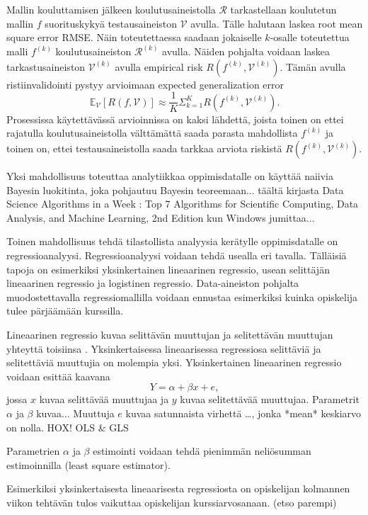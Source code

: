 Mallin kouluttamisen jälkeen koulutusaineistolla $\mathcal{R}$ tarkastellaan koulutetun mallin $f$ suorituskykyä testausaineiston $\mathcal{V}$ avulla. Tälle halutaan laskea root mean square error RMSE. Näin toteutettaessa saadaan jokaiselle $k$-osalle toteutettua malli $f^{(k)}$ koulutusaineiston $\mathcal{R}^{(k)}$ avulla. Näiden pohjalta voidaan laskea tarkastusaineiston $\mathcal{V}^{(k)}$ avulla empirical risk $R(f^{(k)}, \mathcal{V}^{(k)})$. Tämän avulla ristiinvalidointi pystyy arvioimaan expected generalization error $$\mathds{E}_{\mathcal{V}}[R(f,\mathcal{V})] \approx \frac{1}{K}\Sigma^{K}_{k=1} R(f^{(k)}, \mathcal{V}^{(k)}).$$ Prosessissa käytettävässä arvioinnissa on kaksi lähdettä, joista toinen on ettei rajatulla koulutusaineistolla välttämättä saada parasta mahdollista $f^{(k)}$ ja toinen on, ettei testausaineistolla saada tarkkaa arviota riskistä $R(f^{(k)}, \mathcal{V}^{(k)})$.
\color{black}

Yksi mahdollisuus toteuttaa analytiikkaa oppimisdatalle on käyttää naiivia Bayesin luokitinta, joka pohjautuu Bayesin teoreemaan... täältä kirjasta Data Science Algorithms in a Week : Top 7 Algorithms for Scientific Computing, Data Analysis, and Machine Learning, 2nd Edition kun Windows jumittaa...


\color{red}

Toinen mahdollisuus tehdä tilastollista analyysia kerätylle oppimisdatalle on regressioanalyysi. Regressioanalyysi voidaan tehdä usealla eri tavalla. Tälläisiä tapoja on esimerkiksi yksinkertainen lineaarinen regressio, usean selittäjän lineaarinen regressio ja logistinen regressio. Data-aineiston pohjalta muodostettavalla regressiomallilla voidaan ennustaa esimerkiksi kuinka opiskelija tulee pärjäämään kurssilla.

Lineaarinen regressio kuvaa selittävän muuttujan ja selitettävän muuttujan yhteyttä toisiinsa \cite{rossIntroductoryStatistics2017}. Yksinkertaisessa lineaarisessa regressiosa selittäviä ja selitettäviä muuttujia on molempia yksi. Yksinkertainen lineaarinen regressio voidaan esittää kaavana $$Y = \alpha + \beta x + e,$$ jossa $x$ kuvaa selittävää muuttujaa ja $y$ kuvaa selitettävää muuttujaa. Parametrit $\alpha$ ja $\beta$ kuvaa... Muuttuja $e$ kuvaa satunnaista virhettä \dots, jonka *mean* keskiarvo on nolla. HOX! OLS \& GLS

Parametrien $\alpha$ ja $\beta$ estimointi voidaan tehdä pienimmän neliösumman estimoinnilla (least square estimator).

Esimerkiksi yksinkertaisesta lineaarisesta regressiosta on opiskelijan kolmannen viikon tehtävän tulos vaikuttaa opiskelijan kurssiarvosanaan. (etso parempi)



